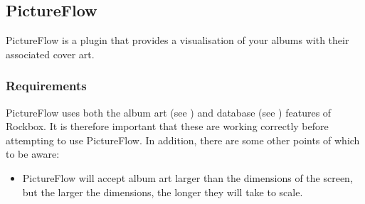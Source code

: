 \subsection{PictureFlow}
PictureFlow is a plugin that provides a visualisation of your albums with
their associated cover art.

\subsubsection{Requirements}
PictureFlow uses both the album art (see ) and 
database (see ) features of Rockbox.
It is therefore important that these are working correctly before attempting
to use PictureFlow. In addition, there are some other points of which to be
aware:

  \begin{itemize}
    \item PictureFlow will accept album art larger than the dimensions of the
    screen, but the larger the dimensions, the longer they will take to scale.
  \end{itemize}


